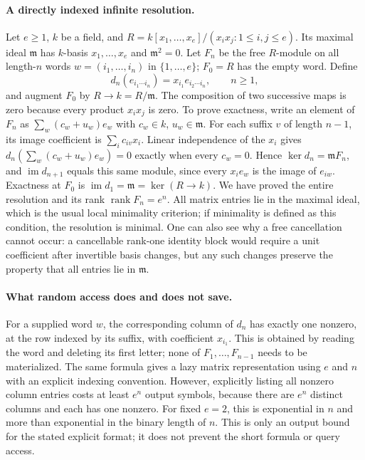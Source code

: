 \documentclass[11pt]{article}
\begin{document}
\paragraph{A directly indexed infinite resolution.}
Let $e\ge1$, $k$ be a field, and
$R=k[x_1,\ldots,x_e]/(x_i x_j:1\le i,j\le e)$.
Its maximal ideal $\mathfrak m$ has $k$-basis $x_1,\ldots,x_e$ and
$\mathfrak m^2=0$. Let $F_n$ be the free $R$-module on all length-$n$ words
$w=(i_1,\ldots,i_n)$ in $\{1,\ldots,e\}$; $F_0=R$ has the empty word.
Define
\[
d_n(e_{i_1\cdots i_n})=x_{i_1}e_{i_2\cdots i_n},\qquad n\ge1,
\]
and augment $F_0$ by $R\to k=R/\mathfrak m$.
The composition of two successive maps is zero because every product
$x_i x_j$ is zero. To prove exactness, write an element of $F_n$ as
$\sum_w(c_w+u_w)e_w$ with $c_w\in k$, $u_w\in\mathfrak m$.
For each suffix $v$ of length $n-1$, its image coefficient is
$\sum_i c_{iv}x_i$. Linear independence of the $x_i$ gives
$d_n(\sum_w(c_w+u_w)e_w)=0$ exactly when every $c_w=0$.
Hence $\ker d_n=\mathfrak m F_n$, and $\operatorname{im}d_{n+1}$ equals
this same module, since every $x_i e_w$ is the image of $e_{iw}$.
Exactness at $F_0$ is $\operatorname{im}d_1=\mathfrak m=\ker(R\to k)$.
We have proved the entire resolution and its rank $\operatorname{rank}F_n=e^n$.
All matrix entries lie in the maximal ideal, which is the usual local minimality
criterion; if minimality is defined as this condition, the resolution is minimal.
One can also see why a free cancellation cannot occur: a cancellable rank-one
identity block would require a unit coefficient after invertible basis changes,
but any such changes preserve the property that all entries lie in
$\mathfrak m$.

\paragraph{What random access does and does not save.}
For a supplied word $w$, the corresponding column of $d_n$ has exactly one
nonzero, at the row indexed by its suffix, with coefficient $x_{i_1}$.
This is obtained by reading the word and deleting its first letter; none of
$F_1,\ldots,F_{n-1}$ needs to be materialized. The same formula gives a lazy
matrix representation using $e$ and $n$ with an explicit indexing convention.
However, explicitly listing all nonzero column entries costs at least $e^n$
output symbols, because there are $e^n$ distinct columns and each has one
nonzero. For fixed $e=2$, this is exponential in $n$ and more than exponential
in the binary length of $n$. This is only an output bound for the stated
explicit format; it does not prevent the short formula or query access.
\end{document}
